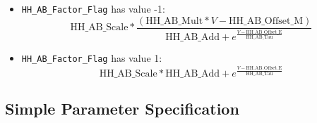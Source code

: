 \documentclass[12pt]{article}
\begin{document}
\begin{itemize}
\item {\tt HH\_AB\_Factor\_Flag} has value -1:
\begin{equation}
  \label{eq:hh-general-ff-1}
  \mathrm{HH\_AB\_Scale} * \frac{ ( \mathrm{HH\_AB\_Mult} * V - \mathrm{HH\_AB\_Offset\_M} ) }{ \mathrm{HH\_AB\_Add} + e ^ {\frac{ V - \mathrm{HH\_AB\_Offset\_E} }{ \mathrm{HH\_AB\_Tau} } } }
\end{equation}
\item {\tt HH\_AB\_Factor\_Flag} has value 1:
\begin{equation}
  \label{eq:hh-general-ff1}
  \mathrm{HH\_AB\_Scale} * \mathrm{HH\_AB\_Add} + e ^ {\frac{ V - \mathrm{HH\_AB\_Offset\_E} }{ \mathrm{HH\_AB\_Tau} } }
\end{equation}
\end{itemize}



\subsection{Simple Parameter Specification}
\label{sec:param-spec}
\end{document}

